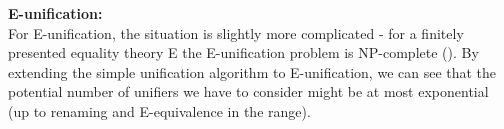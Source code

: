 \textbf{E-unification:}\\
For E-unification, the situation is slightly more complicated - for a finitely presented equality theory E the E-unification problem is NP-complete (\cite{DBLP:conf/stoc/Kozen77}). 
By extending the simple unification algorithm to E-unification, we can see that the potential number of unifiers we have to consider might be at most exponential (up to renaming and E-equivalence in the range).

